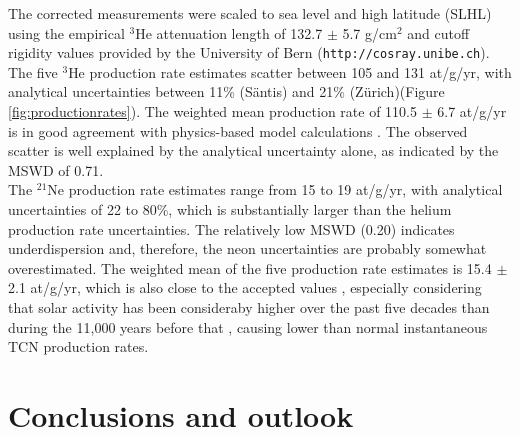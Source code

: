 \documentclass{article}
\begin{document}
The corrected measurements were scaled  to sea level and high latitude
(SLHL) using  the empirical $^3$He  attenuation length of  132.7 $\pm$
5.7 g/cm$^2$ and cutoff rigidity  values provided by the University of
Bern ({\tt  http://cos\-ray.uni\-be.ch}).  The five  $^3$He production
rate estimates  scatter between 105  and 131 at/g/yr,  with analytical
uncertainties between  11\% (S\"{a}ntis) and  21\% (Z\"{u}rich)(Figure
\ref{fig:productionrates}).   The  weighted  mean production  rate  of
110.5 $\pm$ 6.7 at/g/yr is  in good agreement with physics-based model
calculations  \citep{masarik1995}.   The   observed  scatter  is  well
explained by the analytical uncertainty alone, as
indicated by the MSWD of 0.71.  \\

The $^{21}$Ne production  rate estimates range from 15  to 19 at/g/yr,
with analytical  uncertainties of 22  to 80\%, which  is substantially
larger than the helium  production rate uncertainties.  The relatively
low  MSWD (0.20)  indicates underdispersion  and, therefore,  the neon
uncertainties are probably  somewhat overestimated.  The weighted mean
of the five production rate estimates is 15.4 $\pm$ 2.1 at/g/yr, which
is   also  close   to  the   accepted   values  \citep{niedermann1994,
  masarik1995,  niedermann2000, goethals2009,  amidon2009}, especially
considering that  solar activity has been consideraby  higher over the
past  five   decades  than  during   the  11,000  years   before  that
\citep{solanki2004},  causing  lower  than  normal  instantaneous  TCN
production rates.

\section{Conclusions and outlook}\label{sec:conclusions}
\end{document}
